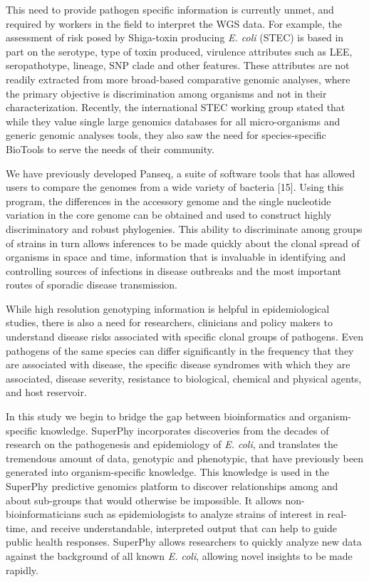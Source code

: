 \documentclass{bmcart}
\begin{document}
This need to provide pathogen specific information is currently unmet, and required by workers in the field to interpret the WGS data. For example, the assessment of risk posed by Shiga-toxin producing \textit{E. coli} (STEC) is based in part on the serotype, type of toxin produced, virulence attributes such as LEE, seropathotype, lineage, SNP clade and other features. These attributes are not readily extracted from more broad-based comparative genomic analyses, where the primary objective is discrimination among organisms and not in their characterization. Recently, the international STEC working group stated that while they value single large genomics databases for all micro-organisms and generic genomic analyses tools, they also saw the need for species-specific BioTools to serve the needs of their community.

We have previously developed Panseq, a suite of software tools that has allowed users to compare the genomes from a wide variety of bacteria [15]. Using this program, the differences in the accessory genome and the single nucleotide variation in the core genome can be obtained and used to construct highly discriminatory and robust phylogenies. This ability to discriminate among groups of strains in turn allows inferences to be made quickly about the clonal spread of organisms in space and time, information that is invaluable in identifying and controlling sources of infections in disease outbreaks and the most important routes of sporadic disease transmission. 

While high resolution genotyping information is helpful in epidemiological studies, there is also a need for researchers, clinicians and policy makers to understand disease risks associated with specific clonal groups of pathogens. Even pathogens of the same species can differ significantly in the frequency that they are associated with disease, the specific disease syndromes with which they are associated, disease severity, resistance to biological, chemical and physical agents, and host reservoir.

In this study we begin to bridge the gap between bioinformatics and organism-specific knowledge. SuperPhy incorporates discoveries from the decades of research on the pathogenesis and epidemiology of \textit{E. coli}, and translates the tremendous amount of data, genotypic and phenotypic, that have previously been generated into organism-specific knowledge. This knowledge is used in the SuperPhy predictive genomics platform to discover relationships among and about sub-groups that would otherwise be impossible. It allows non-bioinformaticians such as epidemiologists to analyze strains of interest in real-time, and receive understandable, interpreted output that can help to guide public health responses. SuperPhy allows researchers to quickly analyze new data against the background of all known \textit{E. coli}, allowing novel insights to be made rapidly.
\end{document}
